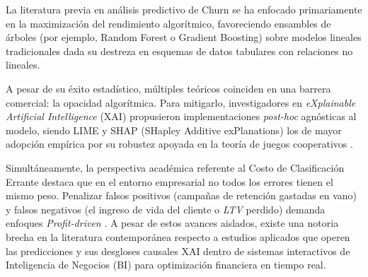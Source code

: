 La literatura previa en análisis predictivo de Churn se ha enfocado primariamente en la maximización del rendimiento algorítmico, favoreciendo ensambles de árboles (por ejemplo, Random Forest o Gradient Boosting) sobre modelos lineales tradicionales dada su destreza en esquemas de datos tabulares con relaciones no lineales.

A pesar de su éxito estadístico, múltiples teóricos coinciden en una barrera comercial: la opacidad algorítmica. Para mitigarlo, investigadores en \textit{eXplainable Artificial Intelligence} (XAI) propusieron implementaciones \textit{post-hoc} agnósticas al modelo, siendo LIME y SHAP (SHapley Additive exPlanations) los de mayor adopción empírica por su robustez apoyada en la teoría de juegos cooperativos \cite{lundberg2017unified}. 

Simultáneamente, la perspectiva académica referente al Costo de Clasificación Errante destaca que en el entorno empresarial no todos los errores tienen el mismo peso. Penalizar falsos positivos (campañas de retención gastadas en vano) y falsos negativos (el ingreso de vida del cliente o \textit{LTV} perdido) demanda enfoques \textit{Profit-driven} \cite{verbeke2012new}. A pesar de estos avances aislados, existe una notoria brecha en la literatura contemporánea respecto a estudios aplicados que operen las predicciones y sus desgloses causales XAI dentro de sistemas interactivos de Inteligencia de Negocios (BI) para optimización financiera en tiempo real.
